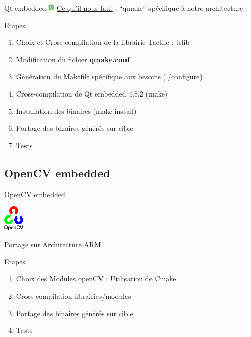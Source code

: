 \documentclass[11pt]{beamer}
\begin{document}
	
	\begin{frame}[label=pageQt2]{Qt embedded  \includegraphics[width=0.3cm]{common/Qt.jpeg}}
	 \centering \underline{Ce qu'il nous faut} : ``qmake'' spécifique à notre architecture :
	\begin{block}{Etapes}
	\begin{enumerate}
			\item Choix et Cross-compilation de la librairie Tactile : tslib \hyperlink{tslib}{}
			\item Modification du fichier \textbf{qmake.conf}
			\item Génération du Makefile spécifique aux besoins (./configure)
			\item Cross-compilation de Qt embedded 4.8.2 (make)
			\item Installation des binaires (make install)
			\item Portage des binaires générés sur cible
			\item Tests
	\end{enumerate}
	\end{block}	
	
	\end{frame}
	

	
	
	\subsection{OpenCV embedded}
	\begin{frame}[label=pageopenCV]{OpenCV embedded}
	\begin{center}
	\includegraphics[width=1cm]{common/opencv.png}\\
	\end{center}
	Portage sur Architecture ARM
	\hyperlink{openCV}{}\\
		\begin{block}{Etapes}
		\begin{enumerate}
			\item Choix des Modules openCV : Utilisation de Cmake
			\item Cross-compilation librairies/modules
			\item Portage des binaires générés sur cible
			\item Tests
	\end{enumerate}
	\end{block}	
	\end{frame}
	
\end{document}
